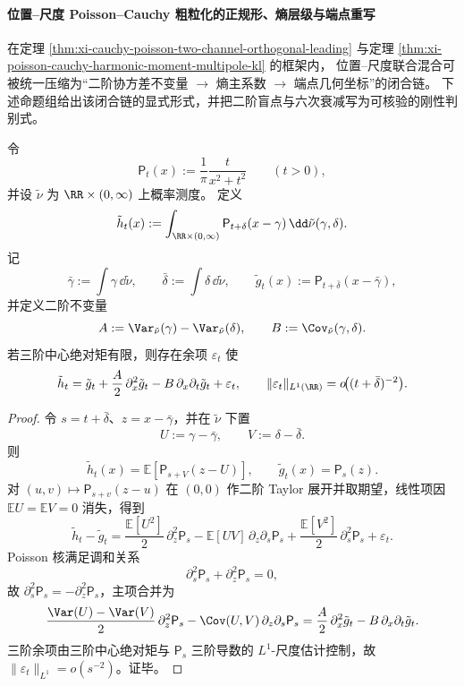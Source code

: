 \paragraph{位置--尺度 Poisson--Cauchy 粗粒化的正规形、熵层级与端点重写}\label{par:xi-poisson-cauchy-location-scale-entropy-rigidity-busemann}
在定理 \ref{thm:xi-cauchy-poisson-two-channel-orthogonal-leading} 与定理 \ref{thm:xi-poisson-cauchy-harmonic-moment-multipole-kl} 的框架内，
位置--尺度联合混合可被统一压缩为“二阶协方差不变量 \(\to\) 熵主系数 \(\to\) 端点几何坐标”的闭合链。
下述命题组给出该闭合链的显式形式，并把二阶盲点与六次衰减写为可核验的刚性判别式。

\begin{proposition}[位置--尺度混合的二阶正规形与调和塌缩]\label{prop:xi-poisson-cauchy-location-scale-second-normal-form}
令
\[
\mathsf P_t(x):=\frac{1}{\pi}\frac{t}{x^2+t^2}\qquad(t>0),
\]
并设 \(\tilde\nu\) 为 \(\RR\times(0,\infty)\) 上概率测度。
定义
\[
\tilde h_t(x):=\int_{\RR\times(0,\infty)} \mathsf P_{t+\delta}(x-\gamma)\,\dd\tilde\nu(\gamma,\delta).
\]
记
\[
\bar\gamma:=\int\gamma\,\dd\tilde\nu,\qquad
\bar\delta:=\int\delta\,\dd\tilde\nu,\qquad
\tilde g_t(x):=\mathsf P_{t+\bar\delta}(x-\bar\gamma),
\]
并定义二阶不变量
\[
A:=\Var_{\tilde\nu}(\gamma)-\Var_{\tilde\nu}(\delta),\qquad
B:=\Cov_{\tilde\nu}(\gamma,\delta).
\]
若三阶中心绝对矩有限，则存在余项 \(\varepsilon_t\) 使
\[
\tilde h_t
=\tilde g_t+\frac{A}{2}\,\partial_x^2\tilde g_t-B\,\partial_x\partial_t\tilde g_t+\varepsilon_t,
\qquad
\|\varepsilon_t\|_{L^1(\RR)}=o\!\bigl((t+\bar\delta)^{-2}\bigr).
\]
\end{proposition}

\begin{proof}
令 \(s=t+\bar\delta\)、\(z=x-\bar\gamma\)，并在 \(\tilde\nu\) 下置
\[
U:=\gamma-\bar\gamma,\qquad V:=\delta-\bar\delta.
\]
则
\[
\tilde h_t(x)=\mathbb E\!\left[\mathsf P_{s+V}(z-U)\right],\qquad
\tilde g_t(x)=\mathsf P_s(z).
\]
对 \((u,v)\mapsto \mathsf P_{s+v}(z-u)\) 在 \((0,0)\) 作二阶 Taylor 展开并取期望，线性项因 \(\mathbb E U=\mathbb E V=0\) 消失，得到
\[
\tilde h_t-\tilde g_t
=\frac{\mathbb E[U^2]}{2}\,\partial_z^2\mathsf P_s
-\mathbb E[UV]\,\partial_z\partial_s\mathsf P_s
+\frac{\mathbb E[V^2]}{2}\,\partial_s^2\mathsf P_s+\varepsilon_t.
\]
Poisson 核满足调和关系
\[
\partial_s^2\mathsf P_s+\partial_z^2\mathsf P_s=0,
\]
故 \(\partial_s^2\mathsf P_s=-\partial_z^2\mathsf P_s\)，主项合并为
\[
\frac{\Var(U)-\Var(V)}{2}\,\partial_z^2\mathsf P_s-\Cov(U,V)\,\partial_z\partial_s\mathsf P_s
=\frac{A}{2}\,\partial_x^2\tilde g_t-B\,\partial_x\partial_t\tilde g_t.
\]
三阶余项由三阶中心绝对矩与 \(\mathsf P_s\) 三阶导数的 \(L^1\)-尺度估计控制，故
\(\|\varepsilon_t\|_{L^1}=o(s^{-2})\)。证毕。
\end{proof}


